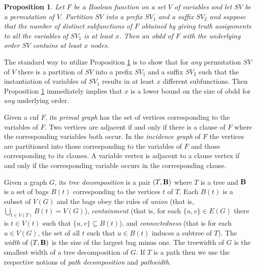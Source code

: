 \documentclass{article}
\newtheorem{proposition}{Proposition}
\begin{document}
\begin{proposition} \label{paths}
Let $F$ be a Boolean function on a set $V$ of variables and let $SV$ be a permutation
of $V$. Partition $SV$ into a prefix $SV_1$
and a suffix $SV_2$ and suppose that the number of distinct subfunctions of $F$ obtained by giving
truth assignments to all the variables of $SV_1$ is at least $x$. Then an {\sc obdd} of $F$ with
the underlying order $SV$ contains at least $x$ nodes. 
\end{proposition}

The standard way to utilize Proposition \ref{paths} is to show that for \emph{any} permutation
$SV$ of $V$ there is a partition of $SV$ into a prefix $SV_1$ and a suffix $SV_2$ such that
the instantiation of variables of $SV_1$ results in at least $x$ different subfunctions.
Then Proposition \ref{paths} immediately implies that $x$ is a lower bound on the size of {\sc obdd}
for \emph{any} underlying order.

\begin{comment}
\begin{proposition} \label{paths}
Let $P_1$ and $P_2$ be $2$ computational paths of $Z$ such that $F_{A(P_1)} \neq F_{A(P_2)}$ Then 
$P_1$ and $P_2$ have distinct final vertices. 
\end{proposition}

It immediately follows from Proposition \ref{paths} that if there are computational paths $P_1, \dots, P_q$ 
such that $F_{A(P_i)}$ are pairwise distinct then $Z$ has at least $q$ vertices. 
If $q$ is superpolynomial compared
to the number of variables $n$ then this means that a superpolynomial lower bound has been established.
\footnote{This is a slight modification of the approach used in \cite{OBDDComp} (Lemma 2). 
The set $\{A(P_1), \dots, A(P_q)\}$ is called in \cite{OBDDComp}
a \emph{fooling set} of the considered {\sc obdd}.}
\end{comment}

Given a {\sc cnf} $F$, its \emph{primal graph} has the set of vertices corresponding to the variables of $F$.
Two vertices are adjacent if and only if there is a clause of $F$ where the
corresponding variables both occur. In the \emph{incidence graph}
of $F$ the vertices are partitioned into those corresponding to the variables of $F$ and those corresponding to its
clauses. A variable vertex is adjacent to a clause vertex if and only if the corresponding variable occurs in the
corresponding clause. 

Given a graph $G$, its \emph{tree decomposition} is a pair $(T,{\bf B})$ where $T$ 
is a tree and ${\bf B}$ is a set of bags $B(t)$ corresponding to the vertices $t$ of $T$.
Each $B(t)$ is a subset of $V(G)$ and the bags obey the rules of \emph{union} (that is, $\bigcup_{t \in V(T)} B(t)=V(G)$),
\emph{containment} (that is, for each $\{u,v\} \in E(G)$ there is $t \in V(t)$ such that $\{u,v\} \subseteq B(t)$),
and \emph{connectedness} (that is for each $u \in V(G)$, the set of all $t$ such that $u \in B(t)$ induces a subtree of $T$).
The \emph{width} of $(T,{\bf B})$ is the size of the largest bag minus one. The treewidth of $G$ is the smallest width of a tree
decomposition of $G$. If $T$ is a path then we use the respective notions of \emph{path decomposition} and \emph{pathwidth}. 
\end{document}
